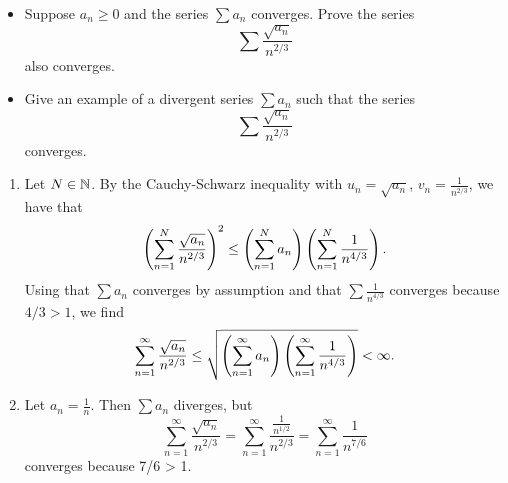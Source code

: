 \begin{problem}
\begin{itemize}
    \item[(a)] Suppose $a_n \geq 0$ and the series $\sum a_n$ converges. Prove the series
    $$ \sum \frac{\sqrt{a_n}}{n^{2/3}} $$
    also converges.
    \item[(b)] Give an example of a divergent series $\sum a_n$ such that the series
    $$ \sum \frac{\sqrt{a_n}}{n^{2/3}} $$
    converges.
\end{itemize}
\begin{solution}
\begin{enumerate}
    \item[(a)] Let $N \in \mathbb{N}$. By the Cauchy-Schwarz inequality with $u_n = \sqrt{a_n}$, $v_n = \frac{1}{n^{2/3}}$, we have that
    $$ \left( \sum_{n=1}^N \frac{\sqrt{a_n}}{n^{2/3}}\right)^2 \leq \left( \sum_{n=1}^N a_n\right)\left( \sum_{n=1}^N \frac{1}{n^{4/3}}\right). $$
    Using that $\sum a_n$ converges by assumption and that $\sum \frac{1}{n^{4/3}}$ converges because $4/3 > 1$, we find
    $$ \sum_{n=1}^\infty \frac{\sqrt{a_n}}{n^{2/3}} \leq \sqrt{\left( \sum_{n=1}^\infty a_n\right)\left( \sum_{n=1}^\infty \frac{1}{n^{4/3}}\right)} < \infty. $$
    
    \item[(b)] Let $a_n = \frac{1}{n}$. Then $\sum a_n$ diverges, but
    $$ \sum_{n=1}^\infty \frac{\sqrt{a_n}}{n^{2/3}} = \sum_{n=1}^\infty \frac{\frac{1}{n^{1/2}}}{n^{2/3}} = \sum_{n=1}^\infty \frac{1}{n^{7/6}} $$
    converges because 7/6 > 1.
\end{enumerate}
\end{solution}
\end{problem}

